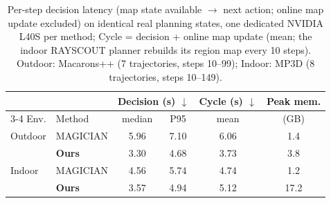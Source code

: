 \begin{table}[t]
\centering
\small
\setlength{\tabcolsep}{4pt}
\begin{tabular}{@{}llcccc@{}}
\toprule
 & & \multicolumn{2}{c}{Decision (s) $\downarrow$} & Cycle (s) $\downarrow$ & Peak mem. \\
\cmidrule(lr){3-4}
Env. & Method & median & P95 & mean & (GB) \\
\midrule
Outdoor & MAGICIAN & 5.96 & 7.10 & 6.06 & 1.4 \\
 & \textbf{Ours} & 3.30 & 4.68 & 3.73 & 3.8 \\
\midrule
Indoor & MAGICIAN & 4.56 & 5.74 & 4.74 & 1.2 \\
 & \textbf{Ours} & 3.57 & 4.94 & 5.12 & 17.2 \\
\bottomrule
\end{tabular}
\caption{Per-step decision latency (map state available $\rightarrow$ next action; online map update excluded) on identical real planning states, one dedicated NVIDIA L40S per method; Cycle = decision + online map update (mean; the indoor RAYSCOUT planner rebuilds its region map every 10 steps). Outdoor: Macarons++ (7 trajectories, steps 10--99); Indoor: MP3D (8 trajectories, steps 10--149).}
\label{tab:runtime}
\end{table}
